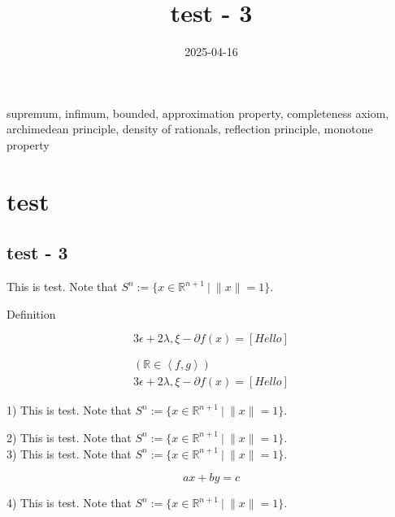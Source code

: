 \documentclass[11pt,reqno]{amsart}
\theoremstyle{definition}
\theoremstyle{remark}
\numberwithin{equation}{section}
\newcommand{\ep}{\epsilon}
\newcommand{\lx}{{\lambda, \xi}}
\newcommand{\pa}{\partial}
\renewcommand{\(}{\left(}
\renewcommand{\)}{\right)}
\newcommand{\R}{\mathbb{R}}
\newcommand{\inner}[2]{\left< #1, #2 \right>}
\newcommand{\test}[1]{\left[ #1 \right]}
\newcommand{\setdefine}{ \ \big| \ }
\newenvironment{text-box}{}{}
\newcommand{\tags}[1]{#1}
\newcommand{\subheading}[1]{#1}
\begin{document}
\title[]
{test - 3}

\date{2025-04-16}

\maketitle

\tags{
    supremum, infimum, bounded, approximation property, 
    completeness axiom, archimedean principle, density of rationals, 
    reflection principle, monotone property
}

\section{test}

\subsection{test - 3}

This is test. Note that $S^n := \{ x \in \R^{n+1} \setdefine \| x \| = 1 \}$.

\subheading{Definition}

\begin{equation}
    3 \epsilon + 2 \lx - \pa f(x) = \test{Hello}
\end{equation}

\begin{align}
    \( \R \in \inner{f}{g} \) \\
    3 \ep + 2 \lx - \pa f(x) = \test{Hello}
\end{align}

\begin{text-box}
    1) This is test. Note that $S^n := \{ x \in \R^{n+1} \setdefine \| x \| = 1 \}$.

    2) This is test. Note that $S^n := \{ x \in \R^{n+1} \setdefine \| x \| = 1 \}$. \\
    3) This is test. Note that $S^n := \{ x \in \R^{n+1} \setdefine \| x \| = 1 \}$.

    \begin{equation}
        ax + by = c
    \end{equation}
    
    4) This is test. Note that $S^n := \{ x \in \R^{n+1} \setdefine \| x \| = 1 \}$.
\end{text-box}
\end{document}

